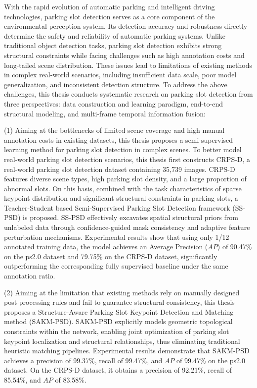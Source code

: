  \setlength{\baselineskip}{20pt}
\begin{englishabstract}
	With the rapid evolution of automatic parking and intelligent driving technologies, parking slot detection serves as a core component of the environmental perception system. Its detection accuracy and robustness directly determine the safety and reliability of automatic parking systems. Unlike traditional object detection tasks, parking slot detection exhibits strong structural constraints while facing challenges such as high annotation costs and long-tailed scene distribution. These issues lead to limitations of existing methods in complex real-world scenarios, including insufficient data scale, poor model generalization, and inconsistent detection structure. To address the above challenges, this thesis conducts systematic research on parking slot detection from three perspectives: data construction and learning paradigm, end-to-end structural modeling, and multi-frame temporal information fusion:

(1) Aiming at the bottlenecks of limited scene coverage and high manual annotation costs in existing datasets, this thesis proposes a semi-supervised learning method for parking slot detection in complex scenes. To better model real-world parking slot detection scenarios, this thesis first constructs CRPS-D, a real-world parking slot detection dataset containing 35,739 images. CRPS-D features diverse scene types, high parking slot density, and a large proportion of abnormal slots. On this basis, combined with the task characteristics of sparse keypoint distribution and significant structural constraints in parking slots, a Teacher-Student based Semi-Supervised Parking Slot Detection framework (SS-PSD) is proposed. SS-PSD effectively excavates spatial structural priors from unlabeled data through confidence-guided mask consistency and adaptive feature perturbation mechanisms. Experimental results show that using only 1/12 annotated training data, the model achieves an Average Precision ($AP$) of 90.47\% on the ps2.0 dataset and 79.75\% on the CRPS-D dataset, significantly outperforming the corresponding fully supervised baseline under the same annotation ratio.

(2) Aiming at the limitation that existing methods rely on manually designed post-processing rules and fail to guarantee structural consistency, this thesis proposes a Structure-Aware Parking Slot Keypoint Detection and Matching method (SAKM-PSD). SAKM-PSD explicitly models geometric topological constraints within the network, enabling joint optimization of parking slot keypoint localization and structural relationships, thus eliminating traditional heuristic matching pipelines. Experimental results demonstrate that SAKM-PSD achieves a precision of 99.37\%, recall of 99.47\%, and $AP$ of 99.47\% on the ps2.0 dataset. On the CRPS-D dataset, it obtains a precision of 92.21\%, recall of 85.54\%, and $AP$ of 83.58\%.


\end{englishabstract}
